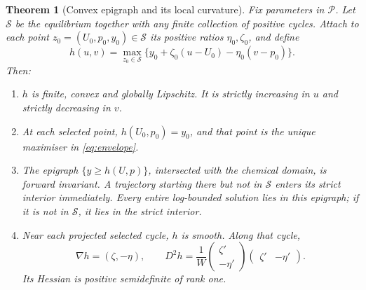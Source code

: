 \documentclass[11pt,a4paper]{article}
\numberwithin{equation}{section}
\newtheorem{theorem}{Theorem}[section]
\theoremstyle{remark}\newtheorem{remark}[theorem]{Remark}
\newcommand{\cP}{\mathcal P}
\newcommand{\cS}{\mathcal S}
\begin{document}
\begin{theorem}[Convex epigraph and its local curvature]\label{thm:envelope}
Fix parameters in $\cP$. Let $\cS$ be the equilibrium together with any finite collection of positive cycles. Attach to each point $z_0=(U_0,p_0,y_0)\in\cS$ its positive ratios $\eta_0,\zeta_0$, and define
\begin{equation}\label{eq:envelope}
h(u,v)=\max_{z_0\in\cS}\{y_0+\zeta_0(u-U_0)-\eta_0(v-p_0)\}.
\end{equation}
Then:
\begin{enumerate}[label=(\roman*)]
\item $h$ is finite, convex and globally Lipschitz. It is strictly increasing in $u$ and strictly decreasing in $v$.
\item At each selected point, $h(U_0,p_0)=y_0$, and that point is the unique maximiser in \eqref{eq:envelope}.
\item The epigraph $\{y\ge h(U,p)\}$, intersected with the chemical domain, is forward invariant. A trajectory starting there but not in $\cS$ enters its strict interior immediately. Every entire log-bounded solution lies in this epigraph; if it is not in $\cS$, it lies in the strict interior.
\item Near each projected selected cycle, $h$ is smooth. Along that cycle,
\begin{equation}\label{eq:hessian}
\nabla h=(\zeta,-\eta),\qquad
D^2h=\frac{1}{W}
\begin{pmatrix}\zeta'\\-\eta'\end{pmatrix}
\begin{pmatrix}\zeta'&-\eta'\end{pmatrix}.
\end{equation}
Its Hessian is positive semidefinite of rank one.
\end{enumerate}
\end{theorem}
\end{document}

